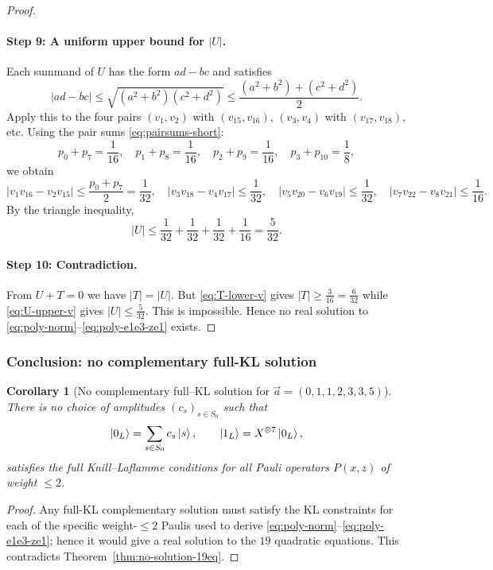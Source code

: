 \documentclass[11pt]{article}
\newtheorem{corollary}{Corollary}
\begin{document}
\begin{proof}
\paragraph{Step 9: A uniform upper bound for $|U|$.}
Each summand of $U$ has the form $ad-bc$ and satisfies
\[
|ad-bc|\le \sqrt{(a^2+b^2)(c^2+d^2)}\le \frac{(a^2+b^2)+(c^2+d^2)}{2}.
\]
Apply this to the four pairs $(v_1,v_2)$ with $(v_{15},v_{16})$, $(v_3,v_4)$ with $(v_{17},v_{18})$, etc.
Using the pair sums \eqref{eq:pairsums-short}:
\[
p_0+p_7=\frac{1}{16},\quad p_1+p_8=\frac{1}{16},\quad p_2+p_9=\frac{1}{16},\quad p_3+p_{10}=\frac18,
\]
we obtain
\[
|v_1v_{16}-v_2v_{15}|\le \frac{p_0+p_7}{2}=\frac{1}{32},\quad
|v_3v_{18}-v_4v_{17}|\le \frac{1}{32},\quad
|v_5v_{20}-v_6v_{19}|\le \frac{1}{32},\quad
|v_7v_{22}-v_8v_{21}|\le \frac{1}{16}.
\]
By the triangle inequality,
\begin{equation}
\label{eq:U-upper-v}
|U|\le \frac{1}{32}+\frac{1}{32}+\frac{1}{32}+\frac{1}{16}=\frac{5}{32}.
\end{equation}

\paragraph{Step 10: Contradiction.}
From $U+T=0$ we have $|T|=|U|$.
But \eqref{eq:T-lower-v} gives $|T|\ge \frac{3}{16}=\frac{6}{32}$ while \eqref{eq:U-upper-v} gives $|U|\le \frac{5}{32}$.
This is impossible. Hence no real solution to \eqref{eq:poly-norm}--\eqref{eq:poly-e1e3-ze1} exists.
\end{proof}

\subsubsection*{Conclusion: no complementary full-KL solution}

\begin{corollary}[No complementary full--KL solution for $\vec a=(0,1,1,2,3,3,5)$]
\label{cor:nogo-fullKL-a0112335}
There is no choice of amplitudes $(c_s)_{s\in S_0}$ such that
\[
\ket{0_L}=\sum_{s\in S_0} c_s\ket{s},\qquad
\ket{1_L}=X^{\otimes 7}\ket{0_L},
\]
satisfies the full Knill--Laflamme conditions for all Pauli operators $P(x,z)$ of weight $\le 2$.
\end{corollary}

\begin{proof}
Any full-KL complementary solution must satisfy the KL constraints for each of the specific weight-$\le2$ Paulis
used to derive \eqref{eq:poly-norm}--\eqref{eq:poly-e1e3-ze1}; hence it would give a real solution
to the $19$ quadratic equations. This contradicts Theorem~\ref{thm:no-solution-19eq}.
\end{proof}
\end{document}
